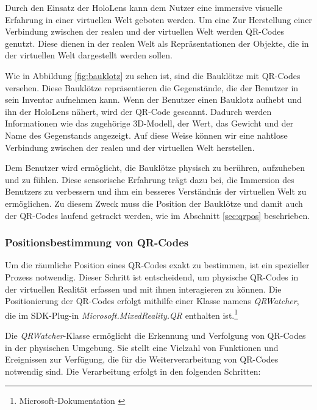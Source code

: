 Durch den Einsatz der HoloLens kann dem Nutzer eine immersive visuelle Erfahrung in einer virtuellen Welt geboten werden. Um eine
Zur Herstellung einer Verbindung zwischen der realen und der virtuellen Welt werden QR-Codes genutzt. Diese dienen in der realen Welt als Repräsentationen der Objekte, die in der virtuellen Welt dargestellt werden sollen.

Wie in Abbildung \ref{fig:bauklotz} zu sehen ist, sind die Bauklötze mit QR-Codes versehen. Diese Bauklötze repräsentieren die Gegenstände,
die der Benutzer in sein Inventar aufnehmen kann. Wenn der Benutzer einen Bauklotz aufhebt und ihn der HoloLens nähert, wird
der QR-Code gescannt. Dadurch werden Informationen wie das zugehörige 3D-Modell, der Wert, das Gewicht und der Name des
Gegenstands angezeigt. Auf diese Weise können wir eine nahtlose Verbindung zwischen der realen und der virtuellen Welt
herstellen.

Dem Benutzer wird ermöglicht, die Bauklötze physisch zu berühren, aufzuheben und zu fühlen. Diese sensorische
Erfahrung trägt dazu bei, die Immersion des Benutzers zu verbessern und ihm ein besseres Verständnis der virtuellen Welt
zu ermöglichen. Zu diesem Zweck muss die Position der Bauklötze und damit auch der QR-Codes laufend getrackt werden, wie im Abschnitt \ref{sec:qrpos} beschrieben.

\subsubsection{\label{sec:qrpos}Positionsbestimmung von QR-Codes}
Um die räumliche Position eines QR-Codes exakt zu bestimmen, ist ein spezieller Prozess notwendig. Dieser Schritt ist entscheidend, um physische QR-Codes in der virtuellen Realität erfassen und mit ihnen interagieren zu können. Die Positionierung der QR-Codes erfolgt mithilfe einer Klasse namens \textit{QRWatcher}, die
im SDK-Plug-in \textit{Microsoft.MixedReality.QR} enthalten ist.\footnote{Microsoft-Dokumentation \cite{QR-Code-Tracking-SDK}}


Die \textit{QRWatcher}-Klasse ermöglicht die Erkennung und Verfolgung von QR-Codes in der physischen Umgebung. Sie stellt eine Vielzahl von Funktionen und Ereignissen zur Verfügung, die für die Weiterverarbeitung von QR-Codes notwendig sind. Die Verarbeitung erfolgt in den folgenden Schritten:

